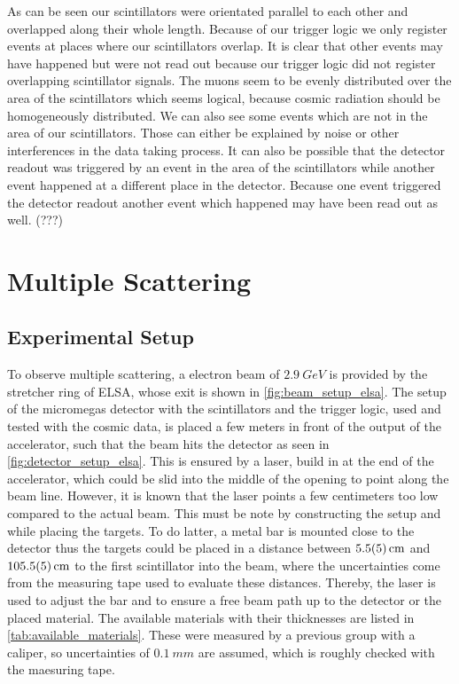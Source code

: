 \documentclass[sn-mathphys-num,iicol]{sn-jnl}
\theoremstyle{thmstyleone}
\theoremstyle{thmstyletwo}
\theoremstyle{thmstylethree}
\begin{document}
As can be seen our scintillators were orientated parallel to each other and overlapped along their whole length.
Because of our trigger logic we only register events at places where our scintillators overlap. 
It is clear that other events may have happened but were not read out because our trigger logic did not register overlapping scintillator signals.
The muons seem to be evenly distributed over the area of the scintillators which seems logical, because cosmic radiation should be homogeneously distributed.
We can also see some events which are not in the area of our scintillators. 
Those can either be explained by noise or other interferences in the data taking process.
It can also be possible that the detector readout was triggered by an event in the area of the scintillators while another event happened at a different place in the detector.
Because one event triggered the detector readout another event which happened may have been read out as well.
(???)


\section{Multiple Scattering}
\subsection{Experimental Setup}
To observe multiple scattering, a electron beam of $\SI{2.9}{GeV}$ is provided by the stretcher ring of ELSA, whose exit is shown in \autoref{fig:beam_setup_elsa}. The setup of the micromegas detector with the scintillators and the trigger logic, used and tested with the cosmic data, is placed a few meters in front of the output of the accelerator, such that the beam hits the detector as seen in \autoref{fig:detector_setup_elsa}. This is ensured by a laser, build in at the end of the accelerator, which could be slid into the middle of the opening to point along the beam line. However, it is known that the laser points a few centimeters too low compared to the actual beam. This must be note by constructing the setup and while placing the targets.
To do latter, a metal bar is mounted close to the detector thus the targets could be placed in a distance between $\SI{5.5\pm 0.5}{cm}$ and $\SI{105.5\pm 0.5}{cm}$ to the first scintillator into the beam, where the uncertainties come from the measuring tape used to evaluate these distances. Thereby, the laser is used to adjust the bar and to ensure a free beam path up to the detector or the placed material.
The available materials with their thicknesses are listed in \autoref{tab:available_materials}. These were measured by a previous group with a caliper, so uncertainties of $\SI{0.1}{mm}$ are assumed, which is roughly checked with the maesuring tape.
\end{document}
